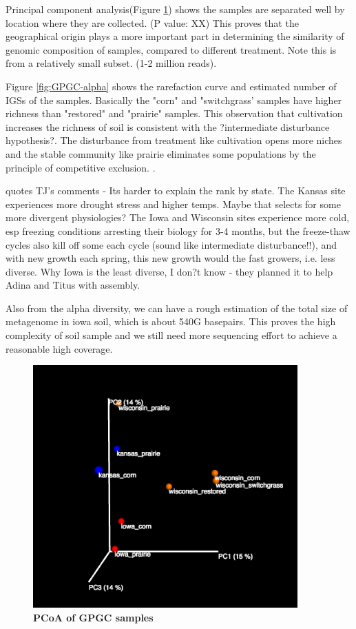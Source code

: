 \documentclass{article}
\begin{document}
Principal component analysis(Figure \ref{fig:GPGC_beta}) shows the samples are separated well by location where they are collected. (P value: XX)
This proves that the geographical origin plays a more important part in determining the similarity of genomic composition of samples, compared to different treatment. Note this is from a relatively small subset. (1-2 million reads). 

Figure \ref{fig:GPGC-alpha} shows the rarefaction curve and estimated number of IGSs of the samples. Basically the "corn" and "switchgrass' samples
have higher richness than "restored" and "prairie" samples. This observation that cultivation increases the richness of soil 
is consistent with the ?intermediate disturbance hypothesis?. The disturbance from treatment like cultivation opens more niches and the stable 
community like prairie eliminates some populations by the principle of competitive exclusion. . 

quotes TJ's comments - Its harder to explain the rank by state.  The Kansas site experiences more drought stress and higher temps. Maybe that selects for some more divergent physiologies? The Iowa and Wisconsin sites experience more cold, esp freezing conditions arresting their biology for 3-4 months, but the freeze-thaw cycles also kill off some each cycle (sound like intermediate disturbance!!), and with new growth each spring, this new growth would the fast growers, i.e. less diverse. Why Iowa is the least diverse, I don?t know - they planned it to help Adina and Titus with assembly.

 Also from the alpha diversity, we can have a rough estimation of the  total size of metagenome in iowa soil, which is about 540G basepairs. This 
 proves the high complexity of soil sample and we still need more sequencing effort to achieve a reasonable high coverage.
 

\begin{figure}[!ht]
 \centerline{\includegraphics[width=4in]{./figures/GPGC_old_subset1M.png}}
\caption{\bf PCoA  of GPGC samples}
\label{fig:GPGC_beta}
\end{figure}
\end{document}
